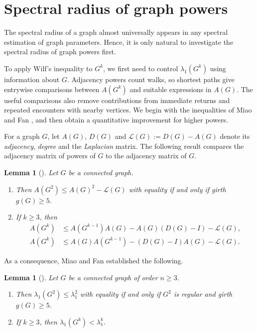 \documentclass[10pt,a4paper]{article}
\theoremstyle{plain}
\newtheorem{lemma}[theorem]{Lemma}
\numberwithin{equation}{section}
\begin{document}
\section{Spectral radius of graph powers}\label{sec:spectral_radius}

The spectral radius of a graph almost universally appears in any spectral estimation of graph parameters. Hence, it is only natural to investigate the spectral radius of graph powers first. 


To apply Wilf's inequality to $G^k$, we first need to control $\lambda_1(G^k)$ using information about $G$. Adjacency powers count walks, so shortest paths give entrywise comparisons between $A(G^k)$ and suitable expressions in $A(G)$. The useful comparisons also remove contributions from immediate returns and repeated encounters with nearby vertices. We begin with the inequalities of Miao and Fan \cite{Miao_Fan_2014}, and then obtain a quantitative improvement for higher powers. 

For a graph $G$, let $A(G)$, $D(G)$ and $\mathcal{L}(G) := D(G) - A(G)$ denote its \emph{adjacency}, \emph{degree} and the \emph{Laplacian} matrix. The following result compares the adjacency matrix of powers of $G$ to the adjacency matrix of $G$.  

\begin{lemma}[\cite{Miao_Fan_2014}]\label{lemma:adjacency_graph_powers} Let $G$ be a connected graph.
\begin{enumerate}
    \item Then $A(G^2)\le A(G)^2 - \mathcal{L}(G)$ with equality if and only if girth $g(G)\ge 5$. 
    \item If $k\ge 3$, then 
    \begin{align*}
    A(G^k) & \le A(G^{k-1})A(G) - A(G)(D(G)-I) - \mathcal{L}(G),\\
    A(G^k) & \le A(G)A(G^{k-1}) - (D(G)-I)A(G) - \mathcal{L}(G).
    \end{align*}
\end{enumerate}
\end{lemma}

As a consequence, Miao and Fan \cite{Miao_Fan_2014} established the following.

\begin{lemma}[\cite{Miao_Fan_2014}]\label{lemma:spectral_radius_powers}
    Let $G$ be a connected graph of order $n\ge 3$. 
    \begin{enumerate}[$(i)$]
        \item Then $\lambda_1(G^2)\le \lambda_1^2$ with equality if and only if $G^2$ is regular and girth $g(G)\ge 5$. 
        \item If $k\ge 3$, then $\lambda_1(G^k) < \lambda_1^k$. 
    \end{enumerate}
\end{lemma}
\end{document}
